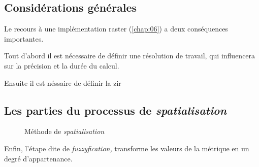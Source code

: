 \subsection{Considérations générales}

Le recours à une implémentation raster (\autoref{chap:06}) a deux conséquences importantes. 

Tout d'abord il est nécessaire de définir une résolution de travail, qui influencera sur la précision et la durée du calcul.

Ensuite il est néssaire de définir la \ac{zir}


\subsection{Les parties du processus de \emph{spatialisation}}



\begin{figure}
  \centering
  
  \caption{Méthode de \emph{spatialisation}}
  \label{fig:methodo_spatialisation}
\end{figure}


Enfin, l'étape dite de \emph{fuzzyfication,} transforme les valeurs de la métrique en un degré d'appartenance.

